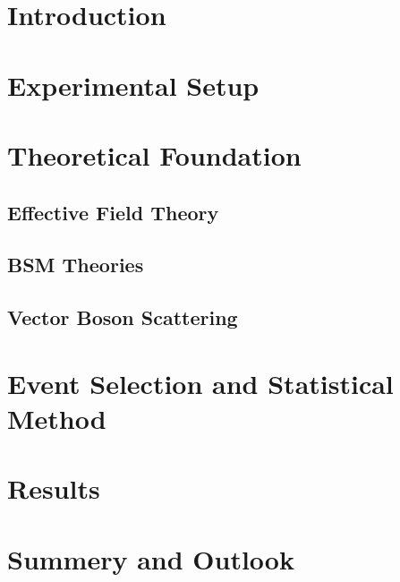 \tableofcontents
\printnoidxglossary[type=acronym]
\printacronyms

\chapter{Introduction}


\chapter{Experimental Setup}


\chapter{Theoretical Foundation}
\label{chapter:Theory}
\section{Effective Field Theory}


\section{BSM Theories}

\newpage

\section{Vector Boson Scattering}


\chapter{Event Selection and Statistical Method}
\label{chapter:Event_and_stat}


\chapter{Results}


\chapter{Summery and Outlook}



\newpage
\nocite{*}
\printbibliography

\listoffigures
\listoftables

